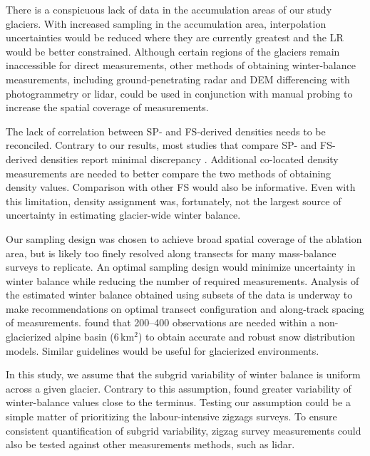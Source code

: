 \documentclass[review,oneside, letterpaper]{igs}
\begin{document}
There is a conspicuous lack of data in the accumulation areas of our study glaciers. With increased sampling in the accumulation area, interpolation uncertainties would be reduced where they are currently greatest and the LR would be better constrained. Although certain regions of the glaciers remain inaccessible for direct measurements, other methods of obtaining winter-balance measurements, including ground-penetrating radar and DEM differencing with photogrammetry or lidar, could be used in conjunction with manual probing to increase the spatial coverage of measurements.

The lack of correlation between SP- and FS-derived densities needs to be reconciled. Contrary to our results, most studies that compare SP- and FS-derived densities report minimal discrepancy \citep[e.g.][and sources within]{Dixon2012}. Additional co-located density measurements are needed to better compare the two methods of obtaining density values. Comparison with other FS would also be informative. Even with this limitation, density assignment was, fortunately, not the largest source of uncertainty in estimating glacier-wide winter balance. 

Our sampling design was chosen to achieve broad spatial coverage of the ablation area, but is likely too finely resolved along transects for many mass-balance surveys to replicate. An optimal sampling design would minimize uncertainty in winter balance while reducing the number of required measurements. Analysis of the estimated winter balance obtained using subsets of the data is underway to make recommendations on optimal transect configuration and along-track spacing of measurements. \cite{Lopez2010} found that 200--400 observations are needed within a non-glacierized alpine basin (6\,km$^2$) to obtain accurate and robust snow distribution models. Similar guidelines would be useful for glacierized environments.

In this study, we assume that the subgrid variability of winter balance is uniform across a given glacier. Contrary to this assumption, \cite{McGrath2015} found greater variability of winter-balance values close to the terminus. Testing our assumption could be a simple matter of prioritizing the labour-intensive zigzags surveys. To ensure consistent quantification of subgrid variability, zigzag survey measurements could also be tested against other measurements methods, such as lidar. 
\end{document}
